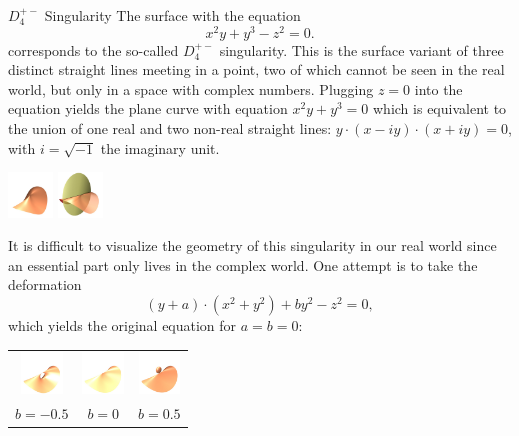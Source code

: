 \begin{surferPage}[D4+- Singularity]{$D_4^{+-}$ Singularity}
	The surface with the equation
	\[
		x^2y+y^3-z^2=0.
	\]
	corresponds to the so-called $D_4^{+-}$ singularity. This is the surface variant of three distinct straight lines meeting in a point, two of which cannot be seen in the real world, but only in a space with complex numbers. Plugging $z=0$ into the equation yields the plane curve with equation $x^2y+y^3=0$ which is equivalent to the union of one real and two non-real straight lines: $y\cdot(x-iy)\cdot(x+iy)=0$, with $i=\sqrt{-1}$ the imaginary unit.
	\vspace{-3ex}%
	\begin{Centering*}%
		\includegraphics[width=1.2cm]{../../common/images/D4pm}\qquad%
		\includegraphics[width=1.2cm]{../../common/images/D4pm_def_with_plane_cut_0}%
	\end{Centering*}
	It is difficult to visualize the geometry of this singularity in our real world since an essential part only lives in the complex world. One attempt is to take the deformation
	\[
		(y+a)\cdot(x^2+y^2)+by^2-z^2=0,
	\]
	which yields the original equation for $a=b=0$:
	\vspace{-1ex}%
	\begin{Centering*}
		\begin{tabular}{c@{\quad}c@{\quad}c}
			\includegraphics[width=1.1cm]{../../common/images/D4pm_1} &
			\includegraphics[width=1.1cm]{../../common/images/D4pm_0} &
			\includegraphics[width=1.1cm]{../../common/images/D4pm_2}\\
			$b=-0.5$ &
			$b=0$ &
			$b=0.5$
		\end{tabular}
	\end{Centering*}
\end{surferPage}
